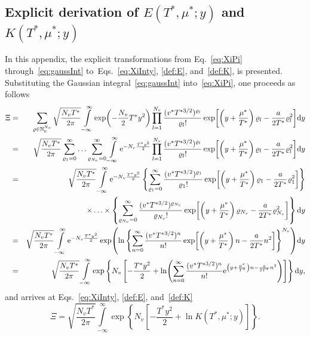 \documentclass[12pt]{article}
\numberwithin{equation}{section}
\begin{document}
	\subsection{\label{sec:app1} Explicit derivation of $E(T^*,\mu^*;y)$ and $K(T^*,\mu^*;y)$}
	In this appendix, the explicit transformations from Eq.~\eqref{eq:XiPi} through~\eqref{eq:gaussInt} to~Eqs.~\eqref{eq:XiInty}, \eqref{def:E}, and~\eqref{def:K}, is presented. Substituting the Gaussian integral~\eqref{eq:gaussInt} into~\eqref{eq:XiPi}, one proceeds as follows
	\begin{eqnarray}
		\Xi 
		&=& 
		\sum_{\varrho \in \mathbb{N}_0^{N_v}} \sqrt{\frac{N_v T^*}{2\pi}} \int\limits_{-\infty}^{\infty} \exp(-\frac{N_v}{2} T^* y^2) 
		\prod\limits_{l=1}^{N_v} \frac{(v^* T^{*3/2})^{\varrho_l}}{\varrho_l !} 
		\exp[\left(y + \frac{\mu^*}{T^*}\right) \varrho_l - \frac{a}{2T^*}\varrho_l^2] {\rm d}y
		\nonumber\\
		&=&
		\sqrt{\frac{N_v T^*}{2\pi}} \sum_{\varrho_1=0}^{\infty} \ldots \sum_{\varrho_{N_v}=0}^{\infty} 
		\int\limits_{-\infty}^{\infty} {\rm e}^{-N_v \frac{T^* y^2}{2}} 
		\prod\limits_{l=1}^{N_v} \frac{(v^* T^{*3/2})^{\varrho_l}}{\varrho_l !} 
		\exp[\left(y + \frac{\mu^*}{T^*}\right) \varrho_l - \frac{a}{2T^*}\varrho_l^2] {\rm d}y
		\nonumber\\
		&=&
		\sqrt{\frac{N_v T^*}{2\pi}} \int\limits_{-\infty}^{\infty} {\rm e}^{-N_v \frac{T^* y^2}{2}}
		\left\{ 
			\sum_{\varrho_1=0}^{\infty} \frac{(v^* T^{*3/2})^{\varrho_1}}{\varrho_1 !} \exp[\left(y + \frac{\mu^*}{T^*}\right) \varrho_1 - \frac{a}{2T^*}\varrho_1^2] 
		\right\}
		\nonumber\\
		&& 
		\times \ldots \times 
		\left\{ 
			\sum_{\varrho_{N_v}=0}^{\infty} \frac{(v^* T^{*3/2})^{\varrho_{N_v}}}{\varrho_{N_v} !} \exp[\left(y + \frac{\mu^*}{T^*}\right) \varrho_{N_v} - \frac{a}{2T^*}\varrho_{N_v}^2] 
		\right\}
		{\rm d}y
		\nonumber\\
		&=&
		\sqrt{\frac{N_v T^*}{2\pi}} \int\limits_{-\infty}^{\infty} {\rm e}^{-N_v \frac{T^* y^2}{2}}
		\exp( \ln \left\{\sum_{n=0}^{\infty} \frac{(v^* T^{*3/2})^{n}}{n!} \exp[\left(y + \frac{\mu^*}{T^*}\right)n - \frac{a}{2T^*}n^2] \right\}^{N_v} ) {\rm d}y
		\nonumber\\
		&=&
		\sqrt{\frac{N_v T^*}{2\pi}} \int\limits_{-\infty}^{\infty}
		\exp 
		\left\{ N_v 
			\left[ -\frac{T^* y^2}{2} + 
			\ln(\sum_{n=0}^{\infty} \frac{(v^* T^{*3/2})^{n}}{n!} {\rm e}^{\left(y + \frac{\mu^*}{T^*}\right)n - \frac{a}{2T^*}n^2}) 
			\right] 
		\right\} {\rm d}y,
	\end{eqnarray}
	and arrives at Eqs.~\eqref{eq:XiInty}, \eqref{def:E}, and~\eqref{def:K}
	\begin{equation}
		\Xi = \sqrt{\frac{N_v T^*}{2\pi}} \int\limits_{-\infty}^{\infty}
		\exp 
		\left\{ N_v 
		\left[ -\frac{T^* y^2}{2} + 
		\ln K(T^*,\mu^*;y) 
		\right] 
		\right\}.
	\end{equation}
	
\end{document}
